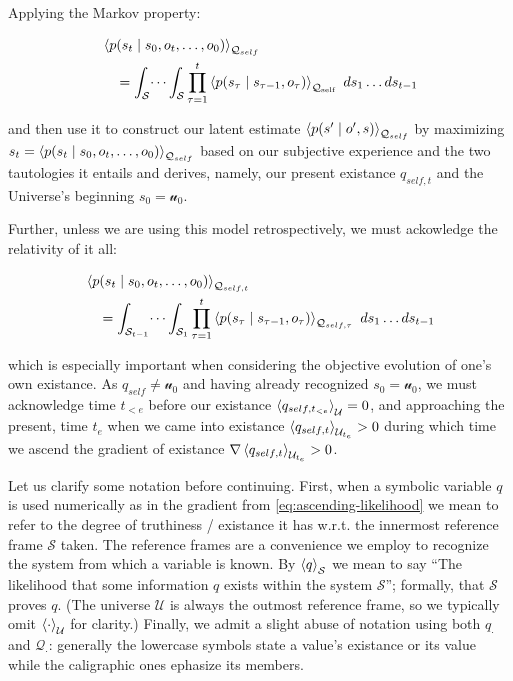 Applying the Markov property:

\[
\begin{aligned}
    &\left\langle p(s_t \mid s_0, o_t, \dots, o_0) \right\rangle_{\substack{\mathcal{Q}_{self}}} \\
    &\quad = \int_{\mathcal{S}} \dots \int_{\mathcal{S}} 
        \prod_{\tau=1}^{t} 
            \left\langle p(s_{\tau} \mid s_{\tau-1}, o_{\tau}) \right\rangle_{\substack{\mathcal{Q}_{\text{self}}}} \
            ds_1 \dots ds_{t-1}
\end{aligned}
\]


and then use it to construct our latent estimate $\left\langle p(s' \mid o', s) \right\rangle_{\substack{\mathcal{Q}_{self}}}$ by maximizing $s_t = \left\langle p(s_t \mid s_0, o_t, \dots, o_0) \right\rangle_{\substack{\mathcal{Q}_{self}}}$ based on our subjective experience and the two tautologies it entails and derives, namely, our present existance $q_{self, t}$ and the Universe's beginning $s_0 = \mathcal{u}_0$.

Further, unless we are using this model retrospectively, we must ackowledge the relativity of it all:

\[
\begin{aligned}
    &\left\langle p(s_t \mid s_0, o_t, \dots, o_0) \right\rangle_{\substack{\mathcal{Q}_{self,t}}} \\
    &\quad = \int_{\mathcal{S}_{t-1}} \dots \int_{\mathcal{S}_1} 
        \prod_{\tau=1}^{t} 
            \left\langle p(s_{\tau} \mid s_{\tau-1}, o_{\tau}) \right\rangle_{\substack{\mathcal{Q}_{self,\tau}}} \
            ds_1 \dots ds_{t-1}
\end{aligned}
\]

which is especially important when considering the objective evolution of one's own existance. As $q_{self} \ne \mathcal{u}_0$ and having already recognized $s_0 = \mathcal{u}_0$, we must acknowledge time $t_{< e}$ before our existance $\left\langle q_{self,t_{< e}} \right\rangle_{\substack{\mathcal{U}}} = 0$, and approaching the present, time $t_e$ when we came into existance $\left\langle q_{self,t} \right\rangle_{\substack{\mathcal{U}_{t_e}}} > 0$ during which time we ascend the gradient of existance $\nabla \left\langle q_{self,t} \right\rangle_{\substack{\mathcal{U}_{t_e}}} > 0$.

\begin{shaded}
Let us clarify some notation before continuing. First, when a symbolic variable $q$ is used numerically as in the gradient from \ref{eq:ascending-likelihood} we mean to refer to the degree of truthiness / existance it has w.r.t. the innermost reference frame $\mathcal{S}$ taken. The reference frames are a convenience we employ to recognize the system from which a variable is known. By $\left\langle q \right\rangle_{\substack{\mathcal{S}}}$ we mean to say ``The likelihood that some information $q$ exists within the system $\mathcal{S}$''; formally, that $\mathcal{S}$ proves $q$. (The universe $\mathcal{U}$ is always the outmost reference frame, so we typically omit $\left\langle \cdot \right\rangle_{\substack{\mathcal{U}}}$ for clarity.) Finally, we admit a slight abuse of notation using both $q_{\cdot}$ and $\mathcal{Q}_{\cdot}$: generally the lowercase symbols state a value's existance or its value while the caligraphic ones ephasize its members.
\end{shaded}

